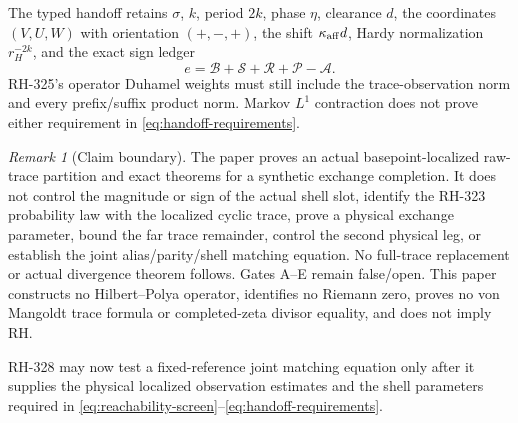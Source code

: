 \documentclass[11pt]{article}
\theoremstyle{remark}
\newtheorem{remark}[theorem]{Remark}
\newcommand{\cA}{\mathcal A}
\newcommand{\cB}{\mathcal B}
\newcommand{\cP}{\mathcal P}
\newcommand{\cR}{\mathcal R}
\newcommand{\cS}{\mathcal S}
\begin{document}
The typed handoff retains $\sigma$, $k$, period $2k$, phase $\eta$,
clearance $d$, the coordinates $(V,U,W)$ with orientation $(+,-,+)$, the
shift $\kappa_{\rm aff}d$, Hardy normalization $r_H^{-2k}$, and the exact
sign ledger
\begin{equation}
 e=\cB+\cS+\cR+\cP-\cA.
 \label{eq:typed-ledger}
\end{equation}
RH-325's operator Duhamel weights must still include the trace-observation
norm and every prefix/suffix product norm.  Markov $L^1$ contraction does not
prove either requirement in \eqref{eq:handoff-requirements}.

\begin{remark}[Claim boundary]
The paper proves an actual basepoint-localized raw-trace partition and exact
theorems for a synthetic exchange completion.  It does not control the
magnitude or sign of the actual shell slot, identify the RH-323 probability
law with the localized cyclic trace, prove a physical exchange parameter,
bound the far trace remainder, control the second physical leg, or establish
the joint alias/parity/shell matching equation.  No full-trace replacement
or actual divergence theorem follows.  Gates A--E remain false/open.  This
paper constructs no Hilbert--Polya operator, identifies no Riemann zero,
proves no von Mangoldt trace formula or completed-zeta divisor equality, and
does not imply RH.
\end{remark}

RH-328 may now test a fixed-reference joint matching equation only after it
supplies the physical localized observation estimates and the shell
parameters required in
\eqref{eq:reachability-screen}--\eqref{eq:handoff-requirements}.
\end{document}
